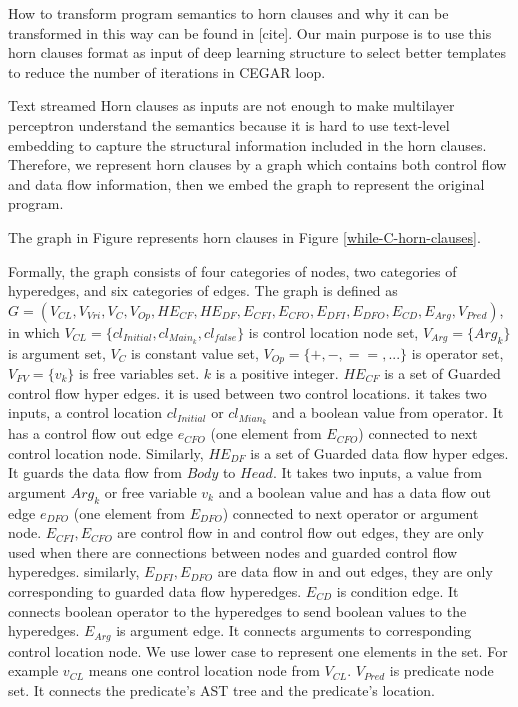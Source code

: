 \documentclass{article}
\begin{document}
How to transform program semantics to horn clauses and why it can be transformed in this way can be found in [cite]. Our main purpose is to use this horn clauses format as input of deep learning structure to select better templates to reduce the number of iterations in CEGAR loop.

Text streamed Horn clauses as inputs are not enough to make multilayer perceptron understand the semantics because it is hard to use text-level embedding to capture the structural information included in the horn clauses. Therefore, we represent horn clauses by a graph which contains both control flow and data flow information, then we embed the graph to represent the original program.

The graph in Figure represents horn clauses in Figure \ref{while-C-horn-clauses}.


Formally, the graph consists of four categories of nodes, two categories of hyperedges, and six categories of edges. The graph is defined as $G=(V_{CL},V_{Vri},V_{C},V_{Op},HE_{CF},HE_{DF},E_{CFI},E_{CFO},E_{DFI},E_{DFO},E_{CD},E_{Arg},V_{Pred})$, in which $V_{CL}=\{cl_{Initial},cl_{Main_{k}},cl_{false}\}$ is control location node set, $V_{Arg}=\{Arg_{k}\}$ is argument set, $V_{C}$ is constant value set, $V_{Op}=\{+,-,==,...\}$ is operator set,$V_{FV}=\{v_{k}\}$ is free variables set. $k$ is a positive integer. $HE_{CF}$ is a set of Guarded control flow hyper edges. it is used between two control locations. it takes two inputs, a control location $cl_{Initial}$ or $cl_{Mian_{k}}$ and a boolean value from operator. It has a control flow out edge $e_{CFO}$ (one element from $E_{CFO}$) connected to next control location node. Similarly, $HE_{DF}$ is a set of Guarded data flow hyper edges. It guards the data flow from $Body$ to $Head$. It takes two inputs, a value from argument $Arg_{k}$ or free variable $v_{k}$ and a boolean value and has a data flow out edge $e_{DFO}$ (one element from $E_{DFO}$) connected to next operator or argument node. $E_{CFI},E_{CFO}$ are control flow in and control flow out edges, they are only used when there are connections between nodes and guarded control flow hyperedges. similarly, $E_{DFI},E_{DFO}$ are data flow in and out edges, they are only corresponding to guarded data flow hyperedges. $E_{CD}$ is condition edge. It connects boolean operator to the hyperedges to send boolean values to the hyperedges. $E_{Arg}$ is argument edge. It connects arguments to corresponding control location node. We use lower case to represent one elements in the set. For example $v_{CL}$ means one control location node from $V_{CL}$. $V_{Pred}$ is predicate node set. It connects the predicate's AST tree and the predicate's location.
\end{document}
